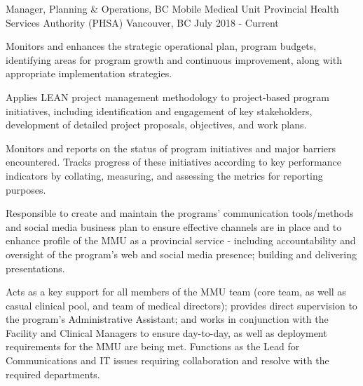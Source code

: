 

\begin{cventries}

  \cventry
    {Manager, Planning \& Operations, BC Mobile Medical Unit} %
    {Provincial Health Services Authority (PHSA)} %
    {Vancouver, BC} %
    {July 2018 - Current} %
    {
      \begin{cvitems} %
        \item {Monitors and enhances the strategic operational plan, program budgets, identifying areas for program growth and continuous improvement, along with appropriate implementation strategies.}
        \item {Applies LEAN project management methodology to project-based program initiatives, including identification and engagement of key stakeholders, development of detailed project proposals, objectives, and work plans.}
        \item {Monitors and reports on the status of program initiatives and major barriers encountered. Tracks progress of these initiatives according to key performance indicators by collating, measuring, and assessing the metrics for reporting purposes.}
        \item {Responsible to create and maintain the programs’ communication tools/methods and social media business plan to ensure effective channels are in place and to enhance profile of the MMU as a provincial service - including accountability and oversight of the program’s web and social media presence; building and delivering presentations.}
        \item {Acts as a key support for all members of the MMU team (core team, as well as casual clinical pool, and team of medical directors); provides direct supervision to the program’s Administrative Assistant; and works in conjunction with the Facility and Clinical Managers to ensure day-to-day, as well as deployment requirements for the MMU are being met. Functions as the Lead for Communications and IT issues requiring collaboration and resolve with the required departments.}
      \end{cvitems}
    }


\end{cventries}
